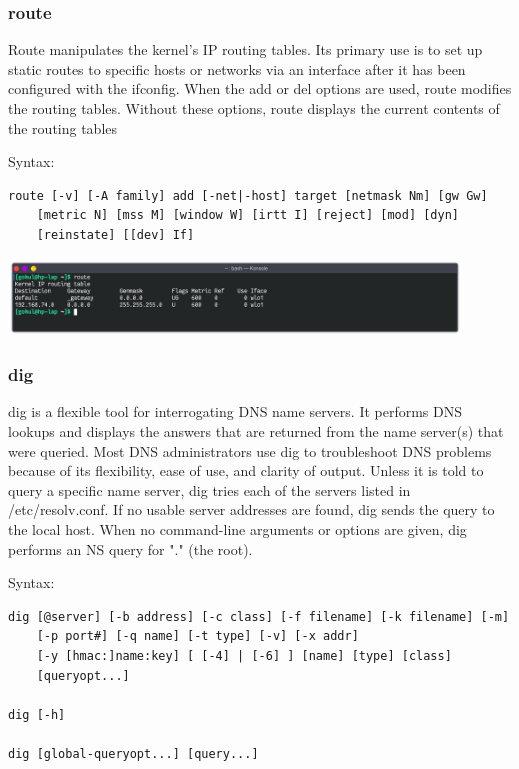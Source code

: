 \subsubsection{route}
Route manipulates the kernel's IP routing tables. Its primary use is to set up static routes 
to specific hosts or networks via an interface after it has been configured with the ifconfig.
When the add or del options are used, route modifies the routing tables. Without these options, 
route displays the current contents of the routing tables
\linebreak[2]

Syntax:
\begin{lstlisting}
route [-v] [-A family] add [-net|-host] target [netmask Nm] [gw Gw] 
	[metric N] [mss M] [window W] [irtt I] [reject] [mod] [dyn] 
	[reinstate] [[dev] If]
\end{lstlisting}

\begin{center}
	\includegraphics[width=0.90\textwidth]{img/p1/ss6.png}
\end{center}


\subsubsection{dig}
dig is a flexible tool for interrogating DNS name servers. It performs DNS lookups and displays the answers 
that are returned from the name server(s) that were queried. Most DNS administrators use dig to troubleshoot 
DNS problems because of its flexibility, ease of use, and clarity of output.
Unless it is told to query a specific name server, dig tries each of the servers listed in /etc/resolv.conf. 
If no usable server addresses are found, dig sends the query to the local host. When no command-line arguments 
or options are given, dig performs an NS query for "." (the root).
\linebreak[2]

Syntax:
\begin{lstlisting}
dig [@server] [-b address] [-c class] [-f filename] [-k filename] [-m] 
	[-p port#] [-q name] [-t type] [-v] [-x addr] 
	[-y [hmac:]name:key] [ [-4] | [-6] ] [name] [type] [class] 
	[queryopt...]

dig [-h]

dig [global-queryopt...] [query...]
\end{lstlisting}

